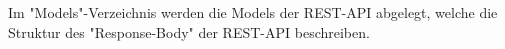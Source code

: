 
Im "Models"-Verzeichnis werden die Models der REST-API abgelegt, welche die Struktur des "Response-Body" der REST-API beschreiben.